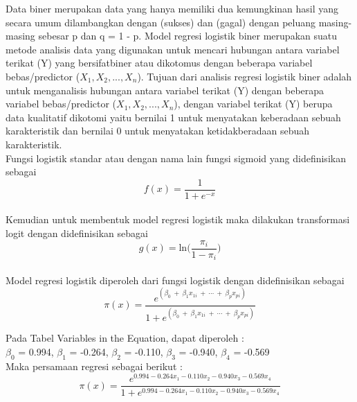\begin{sloppypar}
Data biner merupakan data yang hanya memiliki dua kemungkinan hasil yang secara umum dilambangkan dengan (sukses) dan (gagal) dengan peluang masing-masing sebesar p dan q = 1 - p. Model regresi logistik biner merupakan suatu metode analisis data yang digunakan untuk mencari hubungan antara variabel terikat (Y) yang bersifatbiner atau dikotomus dengan beberapa variabel bebas/predictor ($X_1, X_2, ..., X_n$).
Tujuan dari analisis regresi logistik biner adalah untuk menganalisis hubungan antara variabel terikat (Y) dengan beberapa variabel bebas/predictor ($X_1, X_2, ..., X_n$), dengan variabel terikat (Y) berupa data kualitatif dikotomi yaitu bernilai 1 untuk menyatakan keberadaan sebuah karakteristik dan bernilai 0 untuk menyatakan ketidakberadaan sebuah karakteristik.
\\ Fungsi logistik standar atau dengan nama lain fungsi sigmoid yang didefinisikan sebagai
\begin{equation}
f(x) = \frac{1}{1 + e^{-x}}
\end{equation}
\\ Kemudian untuk membentuk model regresi logistik maka dilakukan transformasi logit dengan didefinisikan sebagai
\begin{equation}
g(x) = \text{ln}\Big( {\frac{\pi_i}{1 - \pi_i}} \Big)
\end{equation}
\\ Model regresi logistik diperoleh dari fungsi logistik dengan didefinisikan sebagai
\begin{equation}
\pi(x) = \frac{e^{(\beta_0\ +\ \beta_1 x_{1i}\ +\ \cdots\ +\ \beta_p x_{pi})}}{1 + e^{(\beta_0\ +\ \beta_1 x_{1i}\ +\ \cdots\ +\ \beta_p x_{pi})}}
\end{equation}
\end{sloppypar}
\begin{test}{
    Pada Tabel Variables in the Equation, dapat diperoleh : \\
    $\beta_0$ = 0.994, $\beta_1$ = -0.264, $\beta_2$ = -0.110, $\beta_3$ = -0.940, $\beta_4$ = -0.569 \\
    Maka persamaan regresi sebagai berikut : \\
    \begin{equation*}
        \pi(x) = \frac{e^{0.994 - 0.264 x_1 - 0.110 x_2 - 0.940 x_3 - 0.569 x_4}}{1 + e^{0.994 - 0.264 x_1 - 0.110 x_2 - 0.940 x_3 - 0.569 x_4}}
    \end{equation*}
}
\end{test}

